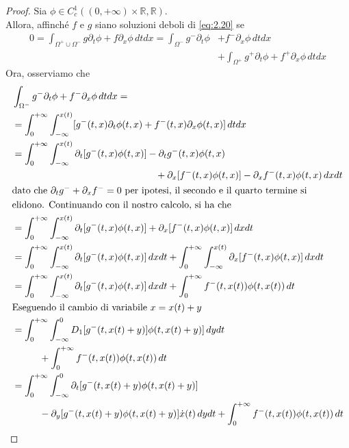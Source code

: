 \begin{proof}
    Sia $\phi\in C^{1}_{c}((0,+\infty)\times\mathbb{R},\mathbb{R})$.\\
    Allora, affinché $f$ e $g$ siano soluzioni deboli di \eqref{eq:2.20} se
    \begin{align*}
        0 = \int_{\Omega^{+}\cup\Omega^{-}}g\partial_{t}\phi+f\partial_{x}\phi\,dtdx = \int_{\Omega^{-}}g^{-}\partial_{t}\phi&+f^{-}\partial_{x}\phi\,dtdx \\&+ \int_{\Omega^{+}}g^{+}\partial_{t}\phi+f^{+}\partial_{x}\phi\,dtdx
    \end{align*}
    Ora, osserviamo che
    \begin{align*}
        &\int_{\Omega^{-}}g^{-}\partial_{t}\phi+f^{-}\partial_{x}\phi\,dtdx =\\
        &=\int_{0}^{+\infty}\int_{-\infty}^{x(t)}[g^{-}(t,x)\partial_{t}\phi(t,x)+f^{-}(t,x)\partial_{x}\phi(t,x)]\,dtdx \\
        &= \int_{0}^{+\infty}\int_{-\infty}^{x(t)}\partial_{t}[g^{-}(t,x)\phi(t,x)]-\partial_{t}g^{-}(t,x)\phi(t,x)\\
        &\hphantom{=}\hspace{5cm}+\partial_{x}[f^{-}(t,x)\phi(t,x)]-\partial_{x}f^{-}(t,x)\phi(t,x)\,dxdt \\
        &\text{dato che $\partial_{t}g^{-}+\partial_{x}f^{-}=0$ per ipotesi, il secondo e il quarto termine si }\\
        &\text{elidono. Continuando con il nostro calcolo, si ha che}\\
        &= \int_{0}^{+\infty}\int_{-\infty}^{x(t)}\partial_{t}[g^{-}(t,x)\phi(t,x)]+\partial_{x}[f^{-}(t,x)\phi(t,x)]\,dxdt \\
        &= \int_{0}^{+\infty}\int_{-\infty}^{x(t)}\partial_{t}[g^{-}(t,x)\phi(t,x)]\,dxdt + \int_{0}^{+\infty}\int_{-\infty}^{x(t)}\partial_{x}[f^{-}(t,x)\phi(t,x)]\,dxdt \\
        &= \int_{0}^{+\infty}\int_{-\infty}^{x(t)}\partial_{t}[g^{-}(t,x)\phi(t,x)]\,dxdt + \int_{0}^{+\infty}f^{-}(t,x(t))\phi(t,x(t))\,dt\\
        &\text{Eseguendo il cambio di variabile $x = x(t) + y$}\\
        &=\int_{0}^{+\infty}\int_{-\infty}^{0}D_{1}[g^{-}(t,x(t)+y)]\phi(t,x(t)+y)]\,dydt \\ &\hspace{1cm}+\int_{0}^{+\infty}f^{-}(t,x(t))\phi(t,x(t))\,dt\\
        &= \int_{0}^{+\infty}\int_{-\infty}^{0}\partial_{t}[g^{-}(t,x(t)+y)\phi(t,x(t)+y)] \\ & \hspace{1cm} -\partial_{y}[g^{-}(t,x(t)+y)\phi(t,x(t)+y)]\dot{x}(t)\,dydt  + \int_{0}^{+\infty}f^{-}(t,x(t))\phi(t,x(t))\,dt\\

\end{align*}
\end{proof}
